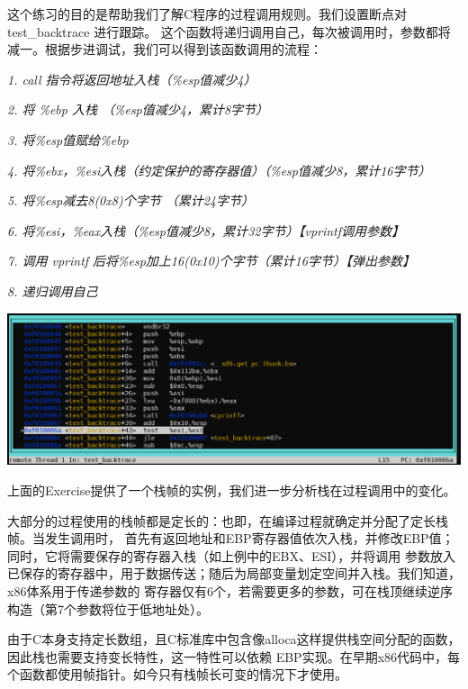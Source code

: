 \documentclass[12pt, letterpaper]{report}
\begin{document}
\quad \par 
这个练习的目的是帮助我们了解C程序的过程调用规则。我们设置断点对 test\_backtrace 进行跟踪。
这个函数将递归调用自己，每次被调用时，参数都将减一。根据步进调试，我们可以得到该函数调用的流程：\par
\quad
\textsl{1. call 指令将返回地址入栈（\%esp值减少4）} \par 
\quad
\textsl{2. 将 \%ebp 入栈 （\%esp值减少4，累计8字节）} \par 
\quad
\textsl{3. 将\%esp值赋给\%ebp } \par 
\quad
\textsl{4. 将\%ebx，\%esi入栈（约定保护的寄存器值）（\%esp值减少8，累计16字节）} \par 
\quad
\textsl{5. 将\%esp减去8(0x8)个字节 （累计24字节）} \par 
\quad 
\textsl{6. 将\%esi，\%eax入栈（\%esp值减少8，累计32字节）【vprintf调用参数】} \par 
\quad
\textsl{7. 调用 vprintf 后将\%esp加上16(0x10)个字节（累计16字节）【弹出参数】} \par
\quad 
\textsl{8. 递归调用自己}  \par 
\quad \par 
\includegraphics[width=\textwidth]{test_backtrace}
\quad \par
上面的Exercise提供了一个栈帧的实例，我们进一步分析栈在过程调用中的变化。\par 
大部分的过程使用的栈帧都是定长的：也即，在编译过程就确定并分配了定长栈帧。当发生调用时，
首先有返回地址和EBP寄存器值依次入栈，并修改EBP值；同时，它将需要保存的寄存器入栈（如上例中的EBX、ESI），并将调用
参数放入已保存的寄存器中，用于数据传送；随后为局部变量划定空间并入栈。我们知道，x86体系用于传递参数的
寄存器仅有6个，若需要更多的参数，可在栈顶继续逆序构造（第7个参数将位于低地址处）。 \par 
由于C本身支持定长数组，且C标准库中包含像alloca这样提供栈空间分配的函数，因此栈也需要支持变长特性，这一特性可以依赖
EBP实现。在早期x86代码中，每个函数都使用帧指针。如今只有栈帧长可变的情况下才使用。 \par 
\quad \par
\end{document}
